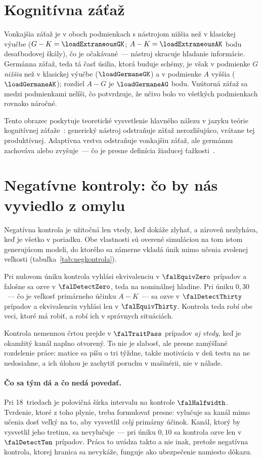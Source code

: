 \section{Kognitívna záťaž}

Vonkajšia záťaž je v oboch podmienkach s nástrojom nižšia než v klasickej výučbe ($G-K=\loadExtraneousGK$; $A-K=\loadExtraneousAK$ bodu desaťbodovej škály), čo je očakávané~--- nástroj skracuje hľadanie informácie. Germánna záťaž, teda tá časť úsilia, ktorá buduje schémy, je však v podmienke $G$ \emph{nižšia} než v klasickej výučbe ($\loadGermaneGK$) a v podmienke $A$ vyššia ($\loadGermaneAK$); rozdiel $A-G$ je $\loadGermaneAG$ bodu. Vnútorná záťaž sa medzi podmienkami nelíši, čo potvrdzuje, že učivo bolo vo všetkých podmienkach rovnako náročné.

Tento obrazec poskytuje teoretické vysvetlenie hlavného nálezu v jazyku teórie kognitívnej záťaže~\cite{sweller2019twenty}: generický nástroj odstraňuje záťaž nerozlišujúco, vrátane tej produktívnej. Adaptívna vrstva odstraňuje vonkajšiu záťaž, ale germánnu zachováva alebo zvyšuje~--- čo je presne definícia žiaducej ťažkosti~\cite{bjork2011desirable}.

\section{Negatívne kontroly: čo by nás vyviedlo z omylu}
\label{sec:vysledky-negkontroly}

Negatívna kontrola je užitočná len vtedy, keď dokáže zlyhať, a zároveň nezlyháva, keď je všetko v poriadku. Obe vlastnosti sú overené simuláciou na tom istom generujúcom modeli, do ktorého sa zámerne vkladá únik mimo učenia zvolenej veľkosti (tabuľka~\ref{tab:negkontrola}).

Pri nulovom úniku kontrola vyhlási ekvivalenciu v $\falEquivZero$ prípadov a falošne sa ozve v $\falDetectZero$, teda na nominálnej hladine. Pri úniku $0{,}30$~--- čo je veľkosť primárneho účinku $A-K$~--- sa ozve v $\falDetectThirty$ prípadov a ekvivalenciu vyhlási len v $\falEquivThirty$. Kontrola teda robí obe veci, ktoré má robiť, a robí ich v správnych situáciách.

Kontrola nemennou črtou prejde v $\falTraitPass$ prípadov \emph{aj vtedy}, keď je okamžitý kanál naplno otvorený. To nie je slabosť, ale presne zamýšľané rozdelenie práce: matice sa píšu o tri týždne, takže motivácia v deň testu na ne nedosiahne, a ich úlohou je zachytiť poruchu v mašinérii, nie v nálade.

\paragraph{Čo sa tým dá a čo nedá povedať.} Pri 18~triedach je polovičná šírka intervalu na kontrole $\falHalfwidth$. Tvrdenie, ktoré z toho plynie, treba formulovať presne: vylučuje sa kanál mimo učenia dosť veľký na to, aby vysvetlil \emph{celý} primárny účinok. Kanál, ktorý by vysvetlil jeho tretinu, sa nevylučuje~--- pri úniku $0{,}10$ sa kontrola ozve len v $\falDetectTen$ prípadov. Práca to uvádza takto a nie inak, pretože negatívna kontrola, ktorej hranica sa nevykáže, funguje ako ubezpečenie namiesto dôkazu.

